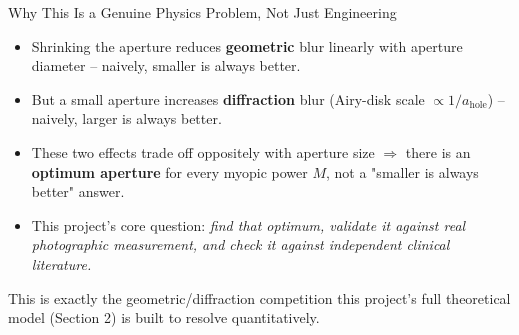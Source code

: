\documentclass[aspectratio=169]{beamer}
\begin{document}
\begin{frame}{Why This Is a Genuine Physics Problem, Not Just Engineering}
  \begin{itemize}
    \item Shrinking the aperture reduces \textbf{geometric} blur linearly with
      aperture diameter -- naively, smaller is always better.
    \item But a small aperture increases \textbf{diffraction} blur
      (Airy-disk scale $\propto 1/a_{\text{hole}}$) -- naively, larger is always better.
    \item These two effects trade off oppositely with aperture size $\Rightarrow$
      there is an \textbf{optimum aperture} for every myopic power $M$, not a
      "smaller is always better" answer.
    \item This project's core question: \emph{find that optimum, validate it
      against real photographic measurement, and check it against independent
      clinical literature.}
  \end{itemize}
  \vspace{0.3cm}
  \begin{alertblock}{This is exactly the geometric/diffraction competition this
    project's full theoretical model (Section 2) is built to resolve quantitatively.}
  \end{alertblock}
\end{frame}
\end{document}
